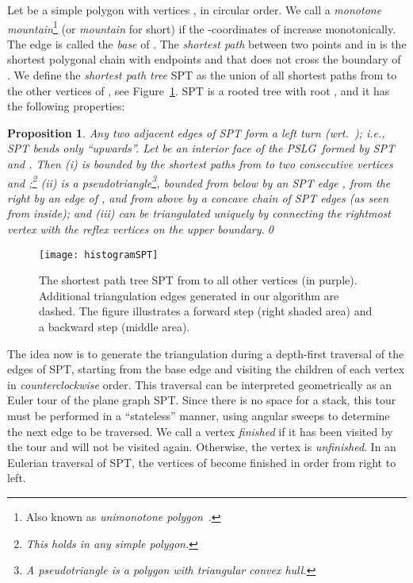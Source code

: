 \documentclass[11pt,a4paper]{article}
\newtheorem{proposition}[theorem]{Proposition}
\newcommand{\histogram}{mountain}
\newcommand{\pslg}{PSLG}
\begin{document}
Let  be a simple polygon with vertices
, in circular order.
We call  a  \emph{monotone mountain}\footnote{Also known as
\emph{unimonotone polygon}~\cite{FournierMo84}.}
(or \emph{\histogram} for short) if the -coordinates of
 increase monotonically.
The edge  is called the \emph{base} of .
The \emph{shortest path} between two points  and  in  is
the shortest polygonal chain with endpoints  and  that does not
cross the boundary of .
We define the \emph{shortest path tree} SPT as the union of all
shortest paths from  to the other vertices of , see
Figure~\ref{fig:SPT}. SPT is a rooted tree with root ,
and it has the following properties:
\begin{proposition}
\label{prop:spt}
Any two adjacent edges of SPT form a left turn \textup(wrt.\ \textup);
i.e., SPT bends only ``upwards''.
Let  be an interior face of the \pslg\ formed by SPT
and . Then (i)  is bounded by the shortest paths
from  to two consecutive vertices 
  and ;\footnote{This holds in any simple polygon.}
  (ii)  is a
pseudotriangle\footnote{A pseudotriangle is a polygon with triangular convex hull.}, bounded from below by
 an SPT edge , from the right by an edge  of ,
 and from above by a concave chain
 of SPT edges \textup(as seen from inside\textup);
 and (iii)
  can be triangulated uniquely by connecting
  the rightmost vertex  with the
  reflex vertices on the upper
  boundary.\qed
\end{proposition}

\begin{figure}
\begin{center}
\texttt{[image: histogramSPT]}
\end{center}
\caption{The shortest path tree SPT from  to all other vertices
(in purple). Additional triangulation edges generated in our algorithm
are dashed. The figure illustrates a forward step (right shaded area)
and a backward step (middle area).}
\label{fig:SPT}
\end{figure}


The idea now is to generate the triangulation during a depth-first traversal of
the edges of SPT, starting
from the base edge  and visiting the children
of each vertex in \emph{counterclockwise} order.
This traversal can be interpreted geometrically as an Euler tour
of the plane graph SPT.
Since there is no space for a stack, this tour must be performed
in a ``stateless'' manner, using angular sweeps to determine the
next edge to be traversed.
We call a vertex \emph{finished} if it has been visited by
the tour and will not be visited again. Otherwise, the vertex is
\emph{unfinished}. In an Eulerian traversal of SPT, the vertices
of  become finished in order from right to left.
\end{document}
